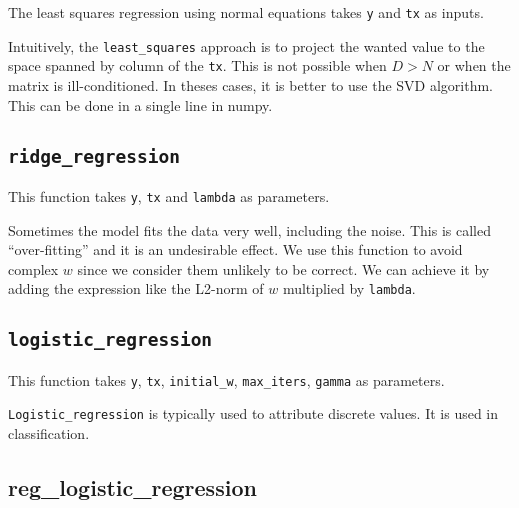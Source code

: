 The least squares regression using normal equations takes \texttt{y} and \texttt{tx} as inputs.

Intuitively, the \texttt{least\_squares} approach is to project the wanted value to the space spanned by column of the \texttt{tx}. This is not possible when $D > N$ or when the matrix is ill-conditioned. In theses cases, it is better to use the SVD algorithm. This can be done in a single line in numpy.

\subsection{\texttt{ridge\_regression}}

This function takes \texttt{y}, \texttt{tx} and \texttt{lambda} as parameters.

Sometimes the model fits the data very well, including the noise. This is called ``over-fitting'' and it is an undesirable effect. We use this function to avoid complex $w$ since we consider them unlikely to be correct. We can achieve it by adding the expression like the L2-norm of $w$ multiplied by \texttt{lambda}. 

\subsection{\texttt{logistic\_regression}}

This function takes \texttt{y}, \texttt{tx}, \texttt{initial\_w}, \texttt{max\_iters}, \texttt{gamma} as parameters.

\texttt{Logistic\_regression} is typically used to attribute discrete values. It is used in classification.


\subsection{reg\_logistic\_regression}
